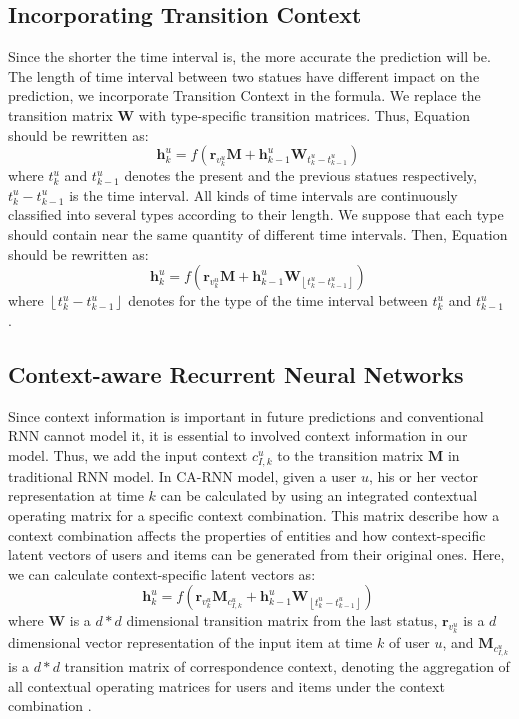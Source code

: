 \documentclass{sig-alternate}
\begin{document}
\subsection{ Incorporating Transition Context}
Since the shorter the time interval is, the more accurate the prediction will be. The length of time interval between two statues have different impact on the prediction, we incorporate Transition Context in the formula. We replace the transition matrix $\textbf{W}$ with type-specific transition matrices. Thus, Equation should be rewritten as: 
\begin{equation}  \label{eqh}
\textbf{h}_{k}^{u}=f\left ( \textbf{r}_{v_{k}^{u}}\textbf{M}+\textbf{h}_{k-1}^{u}\textbf{W}_{ t_k^u-t_{k-1}^u  }\right )
~\end{equation}
 where $t_k^u$ and $t_{k-1}^u$ denotes the present and the previous statues respectively, $t_k^u-t_{k-1}^u$ is the time interval.  All kinds of time intervals are continuously classified into several types according to their length. We suppose that each type should contain near the same quantity of different time intervals. Then, Equation should be rewritten as: 
\begin{equation}
\textbf{h}_{k}^{u}=f\left ( \textbf{r}_{v_{k}^{u}}\textbf{M}+\textbf{h}_{k-1}^{u}\textbf{W}_{\left\lfloor t_k^u-t_{k-1}^u \right\rfloor }\right )
~\end{equation}
where $\left\lfloor t_k^u-t_{k-1}^u \right\rfloor$ denotes for the type of the time interval between $t_k^u$ and $t_{k-1}^u$ .




\subsection{ Context-aware Recurrent Neural Networks}
Since context information is important in future predictions and conventional RNN cannot model it, it is essential to involved context information in our model. Thus, we add the input context $c_{I,k}^{u}$ to the transition matrix $\textbf{M}$ in traditional RNN model. In CA-RNN model, given a user $u$, his or her vector representation at time $k$ can be calculated by using an integrated contextual operating matrix for a specific context combination. This matrix describe how a context combination affects the properties of entities and how context-specific latent vectors of users and items can be generated from their original ones. Here, we can calculate context-specific latent vectors as: 
\begin{equation}
\textbf{h}_{k}^{u}=f\left ( \textbf{r}_{v_{k}^{u}}\textbf{M}_{c_{I,k}^{u}}+\textbf{h}_{k-1}^{u}\textbf{W}_{\left\lfloor t_k^u-t_{k-1}^u \right\rfloor }\right )
~
\end{equation}
where  $\textbf{W}$ is a $d*d$ dimensional transition matrix from the last status, $\textbf{r}_{v_{k}^{u}}$ is a  $d$ dimensional vector representation of the input item at time $k$ of user $u$, and $\textbf{M}_{c_{I,k}^{u}}$ is a  $d*d$ transition matrix of correspondence context, denoting the aggregation of all contextual operating matrices for users and items under the context combination . 
\end{document}
